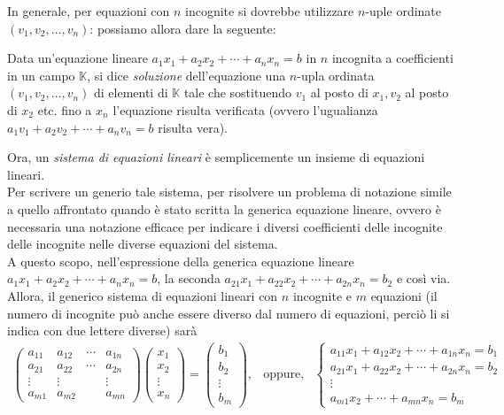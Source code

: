 In generale, per equazioni con $n$ incognite si dovrebbe
utilizzare $n$-uple ordinate $(v_1,v_2,\dots,v_n)$: possiamo
allora dare la seguente:
\begin{defi}
  \label{defi:eqlinematrici1}
  Data un'equazione lineare $a_1x_1+a_2x_2+\cdots+a_nx_n=b$ in
  $n$ incognita a coefficienti in un campo $\mathds{K}$, si dice
  \textit{soluzione} dell'equazione una $n$-upla ordinata
  $(v_1,v_2,\dots,v_n)$ di elementi di $\mathds{K}$ tale che
  sostituendo $v_1$ al posto di $x_1,v_2$ al posto di $x_2$ etc.
  fino a $x_n$ l'equazione risulta verificata (ovvero
  l'ugualianza $a_1v_1+a_2v_2+\cdots+a_nv_n=b$ risulta vera).
\end{defi}
Ora, un \textit{sistema di equazioni lineari} è semplicemente un
insieme di equazioni lineari.\\
Per scrivere un generio tale sistema, per risolvere un problema
di notazione simile a quello affrontato quando è stato scritta
la generica equazione lineare, ovvero è necessaria una notazione
efficace per indicare i diversi coefficienti delle incognite
delle incognite nelle diverse equazioni del sistema.\\
A questo scopo, nell'espressione della generica equazione
lineare $a_1x_1+a_2x_2+\cdots+a_nx_n=b$, la seconda $a_{21}x_1+a_{22}x_2+\cdots+a_{2n}x_n=b_2$ e così via.\\
Allora, il generico sistema di equazioni lineari con $n$
incognite e $m$ equazioni (il numero di incognite può anche
essere diverso dal numero di equazioni, perciò li si indica con
due lettere diverse) sarà
\begin{eqnarray}
  \label{eq:eqlinematrici2}
  \begin{pmatrix}
    a_{11} & a_{12} & \cdots & a_{1n}\\
    a_{21} & a_{22} & \cdots & a_{2n}\\
    \vdots & \vdots & & \vdots\\
    a_{m1} &a_{m2} & &a_{mn}
  \end{pmatrix}
  \begin{pmatrix}
    x_1\\
    x_2\\
    \vdots\\
    x_n
  \end{pmatrix}=
  \begin{pmatrix}
    b_1\\
    b_2\\
    \vdots\\
    b_m
  \end{pmatrix}, & \text{oppure,} &
                  \begin{cases}
                    a_{11}x_1 + a_{12}x_2+\cdots+a_{1n}x_n=b_1\\
                    a_{21}x_1+a_{22}x_2+\cdots+a_{2n}x_n=b_2\\
                    \vdots\\
                    a_{m1}x_2+\cdots+a_{mn}x_n=b_m
                  \end{cases}
\end{eqnarray}
